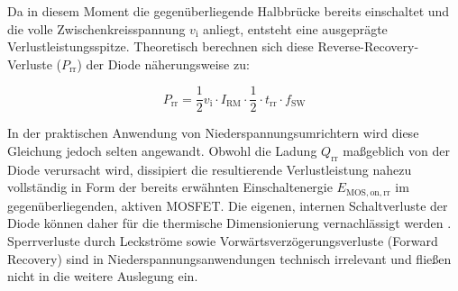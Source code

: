 Da in diesem Moment die gegenüberliegende Halbbrücke bereits einschaltet und die volle Zwischenkreisspannung $v_\mathrm{i}$ anliegt, entsteht eine ausgeprägte Verlustleistungsspitze. Theoretisch berechnen sich diese Reverse-Recovery-Verluste ($P_{\mathrm{rr}}$) der Diode näherungsweise zu:

\begin{equation}
    P_{\mathrm{rr}} = \frac{1}{2} v_{\mathrm{i}} \cdot  I_{\mathrm{RM}} \cdot \frac{1}{2}\cdot t_\mathrm{rr} \cdot f_{\mathrm{SW}}
    \label{eq:p_rr}
\end{equation}

In der praktischen Anwendung von Niederspannungsumrichtern wird diese Gleichung jedoch selten angewandt. Obwohl die Ladung $Q_{\mathrm{rr}}$ maßgeblich von der Diode verursacht wird, dissipiert die resultierende Verlustleistung nahezu vollständig in Form der bereits erwähnten Einschaltenergie $E_{\mathrm{MOS,on,rr}}$ im gegenüberliegenden, aktiven MOSFET. Die eigenen, internen Schaltverluste der Diode können daher für die thermische Dimensionierung vernachlässigt werden \cite[S.~10]{Infineon_MOSFET_Losses}.
Sperrverluste durch Leckströme sowie Vorwärtsverzögerungsverluste (Forward Recovery) sind in Niederspannungsanwendungen technisch irrelevant und fließen nicht in die weitere Auslegung ein.
